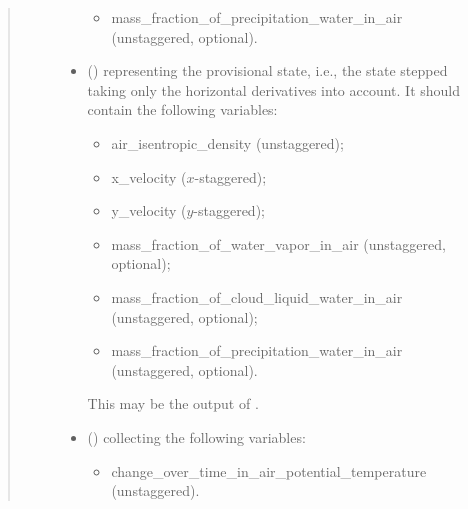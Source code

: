 \documentclass[letterpaper,10pt,english]{sphinxmanual}
\begin{document}
\begin{fulllineitems}
\begin{fulllineitems}
\begin{quote}
\begin{description}
\begin{itemize}
\begin{itemize}
\item {} 
mass\_fraction\_of\_precipitation\_water\_in\_air (unstaggered, optional).

\end{itemize}


\item {} 
 () \textendash{} 
{\hyperref[\detokenize{api:storages.state_isentropic.StateIsentropic}]{}} representing the provisional state, i.e.,
the state stepped taking only the horizontal derivatives into account.
It should contain the following variables:
\begin{itemize}
\item {} 
air\_isentropic\_density (unstaggered);

\item {} 
x\_velocity (\(x\)-staggered);

\item {} 
y\_velocity (\(y\)-staggered);

\item {} 
mass\_fraction\_of\_water\_vapor\_in\_air (unstaggered, optional);

\item {} 
mass\_fraction\_of\_cloud\_liquid\_water\_in\_air (unstaggered, optional);

\item {} 
mass\_fraction\_of\_precipitation\_water\_in\_air (unstaggered, optional).

\end{itemize}

This may be the output of
{\hyperref[\detokenize{api:dycore.prognostic_isentropic_nonconservative.PrognosticIsentropicNonconservative.step_neglecting_vertical_advection}]{}}.


\item {} 
 () \textendash{} 
{\hyperref[\detokenize{api:storages.grid_data.GridData}]{}} collecting the following variables:
\begin{itemize}
\item {} 
change\_over\_time\_in\_air\_potential\_temperature (unstaggered).

\end{itemize}


\end{itemize}


\end{description}
\end{quote}
\end{fulllineitems}
\end{fulllineitems}
\end{document}
